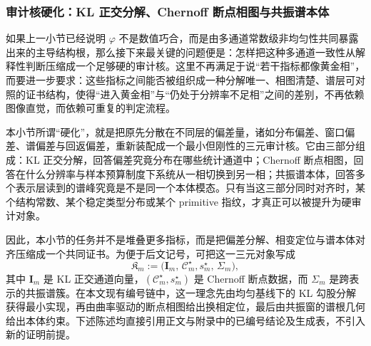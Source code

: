 \subsubsection{审计核硬化：KL 正交分解、Chernoff 断点相图与共振谱本体}\label{subsubsec:discussion-audit-kernel-hardening-kl-chernoff-resonance}
如果上一小节已经说明 \(\varphi\) 不是数值巧合，而是由多通道常数级非均匀性共同暴露出来的主导结构根，那么接下来最关键的问题便是：怎样把这种多通道一致性从解释性判断压缩成一个足够硬的审计核。这里不再满足于说“若干指标都像黄金相”，而要进一步要求：这些指标之间能否被组织成一种分解唯一、相图清楚、谱层可对照的证书结构，使得“进入黄金相”与“仍处于分辨率不足相”之间的差别，不再依赖图像直觉，而依赖可重复的判定流程。

本小节所谓“硬化”，就是把原先分散在不同层的偏差量，诸如分布偏差、窗口偏差、谱偏差与回返偏差，重新装配成一个最小但刚性的三元审计核。它由三部分组成：KL 正交分解，回答偏差究竟分布在哪些统计通道中；Chernoff 断点相图，回答在什么分辨率与样本预算制度下系统从一相切换到另一相；共振谱本体，回答多个表示层读到的谱峰究竟是不是同一个本体模态。只有当这三部分同时对齐时，某个结构常数、某个稳定类型分布或某个 primitive 指纹，才真正可以被提升为硬审计对象。

因此，本小节的任务并不是堆叠更多指标，而是把偏差分解、相变定位与谱本体对齐压缩成一个共同证书。为便于后文记号，可把这一三元对象写成
\[
\mathfrak K_m
:=
\bigl(
\mathbf I_m,\,
\mathcal C_m^\star,s_m^\star,\,
\Sigma_m
\bigr),
\]
其中 \(\mathbf I_m\) 是 KL 正交通道向量，\((\mathcal C_m^\star,s_m^\star)\) 是 Chernoff 断点数据，而 \(\Sigma_m\) 是跨表示的共振谱簇。在本文现有编号链中，这一理念先由均匀基线下的 KL 勾股分解获得最小实现，再由曲率驱动的断点相图给出换相定位，最后由共振窗的谱根几何给出本体约束。下述陈述均直接引用正文与附录中的已编号结论及生成表，不引入新的证明前提。

